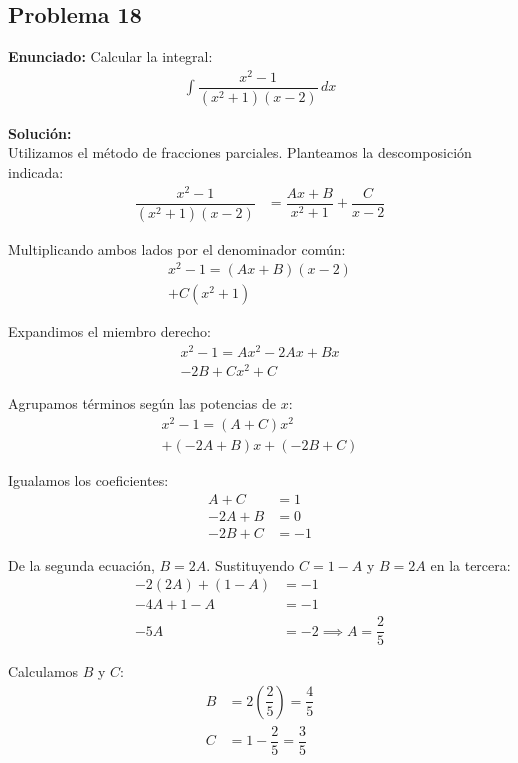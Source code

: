\subsection*{Problema 18}

\textbf{Enunciado:} Calcular la integral:
\begin{align*}
\int \dfrac{x^2 - 1}{(x^2 + 1)(x - 2)} \, dx
\end{align*}

\textbf{Solución:} \\
Utilizamos el método de fracciones parciales. 
Planteamos la descomposición indicada:
\begin{align*}
\dfrac{x^2 - 1}{(x^2 + 1)(x - 2)} &= \dfrac{Ax + B}{x^2 + 1} + \dfrac{C}{x - 2}
\end{align*}

Multiplicando ambos lados por el denominador común:
\begin{multline*}
x^2 - 1 = (Ax + B)(x - 2) \\
+ C(x^2 + 1)
\end{multline*}

Expandimos el miembro derecho:
\begin{multline*}
x^2 - 1 = Ax^2 - 2Ax + Bx \\
- 2B + Cx^2 + C
\end{multline*}

Agrupamos términos según las potencias de $x$:
\begin{multline*}
x^2 - 1 = (A + C)x^2 \\
+ (-2A + B)x + (-2B + C)
\end{multline*}

Igualamos los coeficientes:
\begin{align*}
A + C &= 1 \\
-2A + B &= 0 \\
-2B + C &= -1
\end{align*}

De la segunda ecuación, $B = 2A$. 
Sustituyendo $C = 1 - A$ y $B = 2A$ en la tercera:
\begin{align*}
-2(2A) + (1 - A) &= -1 \\
-4A + 1 - A &= -1 \\
-5A &= -2 \implies A = \dfrac{2}{5}
\end{align*}

Calculamos $B$ y $C$:
\begin{align*}
B &= 2\left(\dfrac{2}{5}\right) = \dfrac{4}{5} \\
C &= 1 - \dfrac{2}{5} = \dfrac{3}{5}
\end{align*}

